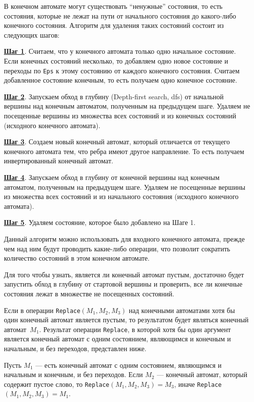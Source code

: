 \documentclass{matmex-diploma}
\begin{document}
В конечном автомате могут существовать ``ненужные'' состояния, то есть состояния, которые не лежат на пути от начального состояния до какого-либо конечного состояния. Алгоритм для удаления таких состояний состоит из следующих шагов:

\textbf{\underline{Шаг 1}}. Считаем, что у конечного автомата только одно начальное состояние. Если конечных состояний несколько, то добавляем одно новое состояние и переходы по \verb|Eps| к этому состоянию от каждого конечного состояния. Считаем добавленное состояние конечным, то есть получаем одно конечное состояние.

\textbf{\underline{Шаг 2}}. Запускаем обход в глубину (Depth-first search, dfs) от начальной вершины над конечным автоматом, полученным на предыдущем шаге. Удаляем не посещенные вершины из множества всех состояний и из конечных состояний (исходного конечного автомата).

\textbf{\underline{Шаг 3}}. Создаем новый конечный автомат, который отличается от текущего конечного автомата тем, что ребра имеют другое направление. То есть получаем инвертированный конечный автомат.

\textbf{\underline{Шаг 4}}. Запускаем обход в глубину от конечной вершины над конечным автоматом, полученным на предыдущем шаге. Удаляем не посещенные вершины из множества всех состояний и из начального состояния (исходного конечного автомата). 

\textbf{\underline{Шаг 5}}. Удаляем состояние, которое было добавлено на Шаге 1. 

Данный алгоритм можно использовать для входного конечного автомата, прежде чем над ним будут проводить какие-либо операции, что позволит сократить количество состояний в этом конечном автомате.

Для того чтобы узнать, является ли конечный автомат пустым, достаточно будет запустить обход в глубину от стартовой вершины и проверить, все ли конечные состояния лежат в множестве не посещенных состояний.

Если в операции \verb|Replace|$(M_1, M_2, M_3)$ над конечными автоматами хотя бы один конечный автомат является пустым, то результатом будет являться конечный автомат~$M_1$. Результат операции \verb|Replace|, в которой хотя бы один аргумент является конечный автомат с одним состоянием, являющимся и конечным и начальным, и без переходов, представлен ниже.

Пусть $M_1$ --- есть конечный автомат с одним состоянием, являющимся и начальным и конечным, и без переходов. Если $M_2$ --- конечный автомат, который содержит пустое слово, то \verb|Replace|$(M_1, M_2, M_3) = M_3$, иначе \verb|Replace|$(M_1, M_2, M_3) = M_1$. 
\end{document}
